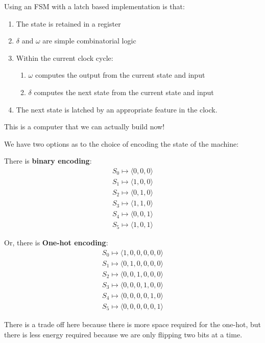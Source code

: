 \documentclass[11pt,a4paper,titlepage,dvipsnames,cmyk]{scrartcl}
\begin{document}
Using an FSM with a latch based implementation is that:
\begin{enumerate}
    \item The state is retained in a register
    \item $\delta$ and $\omega$ are simple combinatorial logic
    \item Within the current clock cycle:
        \begin{enumerate}
            \item $\omega$ computes the output from the current state and
                input
            \item $\delta$ computes the next state from the current state
                and input
        \end{enumerate}
    \item The next state is latched by an appropriate feature in the
        clock.
\end{enumerate}

This is a computer that we can actually build now!

We have two options as to the choice of encoding the state of the machine:

There is \textbf{binary encoding}:
\begin{align*}
    S_0 \mapsto \langle 0, 0, 0 \rangle \\
    S_1 \mapsto \langle 1, 0, 0 \rangle \\
    S_2 \mapsto \langle 0, 1, 0 \rangle \\
    S_3 \mapsto \langle 1, 1, 0 \rangle \\
    S_4 \mapsto \langle 0, 0, 1 \rangle \\
    S_5 \mapsto \langle 1, 0, 1 \rangle 
\end{align*}

Or, there is \textbf{One-hot encoding}:
\begin{align*}
    S_0 \mapsto \langle 1, 0, 0, 0, 0, 0 \rangle \\
    S_1 \mapsto \langle 0, 1, 0, 0, 0, 0 \rangle \\
    S_2 \mapsto \langle 0, 0, 1, 0, 0, 0 \rangle \\
    S_3 \mapsto \langle 0, 0, 0, 1, 0, 0 \rangle \\
    S_4 \mapsto \langle 0, 0, 0, 0, 1, 0 \rangle \\
    S_5 \mapsto \langle 0, 0, 0, 0, 0, 1 \rangle 
\end{align*}

There is a trade off here because there is more space required for the
one-hot, but there is less energy required because we are only flipping
two bits at a time.
\end{document}
